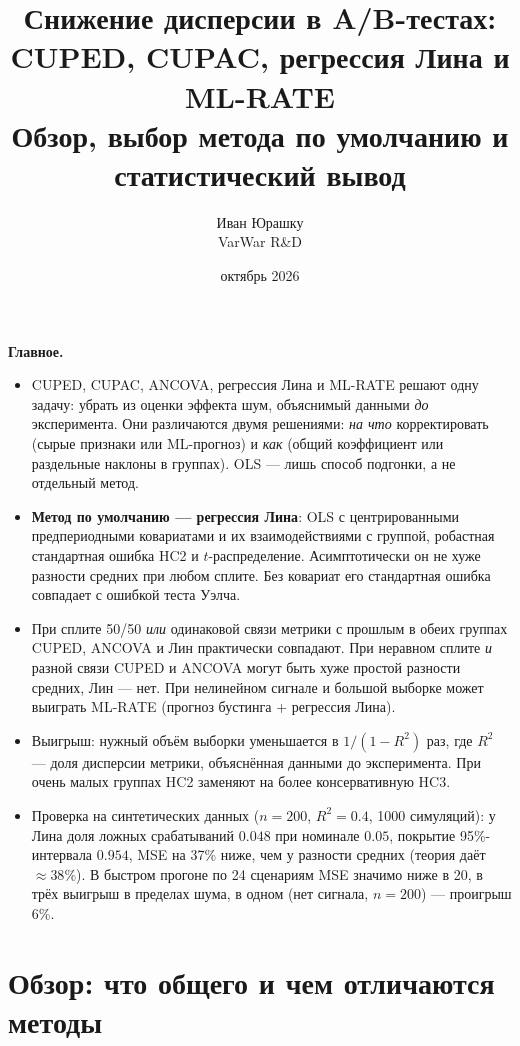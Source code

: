 \documentclass[10pt,a4paper]{article}
\title{\textbf{Снижение дисперсии в A/B-тестах:\\ CUPED, CUPAC, регрессия Лина и ML-RATE}\\[0.4em]
\large Обзор, выбор метода по умолчанию и статистический вывод}
\author{Иван Юрашку\\[0.2em]\small VarWar R\&D}
\date{октябрь 2026}
\begin{document}
\maketitle

\begin{keybox}
\textbf{Главное.}
\begin{itemize}
  \item CUPED, CUPAC, ANCOVA, регрессия Лина и ML-RATE решают одну задачу: убрать из оценки
        эффекта шум, объяснимый данными \emph{до} эксперимента. Они различаются двумя решениями:
        \emph{на что} корректировать (сырые признаки или ML-прогноз) и \emph{как} (общий коэффициент
        или раздельные наклоны в группах). OLS --- лишь способ подгонки, а не отдельный метод.
  \item \textbf{Метод по умолчанию --- регрессия Лина}: OLS с центрированными предпериодными
        ковариатами и их взаимодействиями с группой, робастная стандартная ошибка HC2
        и $t$-распределение. Асимптотически он не хуже разности средних при любом сплите.
        Без ковариат его стандартная ошибка совпадает с ошибкой теста Уэлча.
  \item При сплите 50/50 \emph{или} одинаковой связи метрики с прошлым в обеих группах
        CUPED, ANCOVA и Лин практически совпадают. При неравном сплите \emph{и} разной связи
        CUPED и ANCOVA могут быть хуже простой разности средних, Лин --- нет. При нелинейном
        сигнале и большой выборке может выиграть ML-RATE (прогноз бустинга + регрессия Лина).
  \item Выигрыш: нужный объём выборки уменьшается в $1/(1-R^2)$ раз, где $R^2$ --- доля
        дисперсии метрики, объяснённая данными до эксперимента. При очень малых группах
        HC2 заменяют на более консервативную HC3.
  \item Проверка на синтетических данных ($n=200$, $R^2=0.4$, 1000 симуляций): у Лина
        доля ложных срабатываний $0.048$ при номинале $0.05$, покрытие 95\%-интервала $0.954$,
        MSE на 37\% ниже, чем у разности средних (теория даёт $\approx38\%$). В быстром прогоне по
        24 сценариям MSE значимо ниже в 20, в трёх выигрыш в пределах шума, в одном (нет сигнала,
        $n=200$) --- проигрыш 6\%.
\end{itemize}
\end{keybox}

\section{Обзор: что общего и чем отличаются методы}\label{sec:overview}
\end{document}
